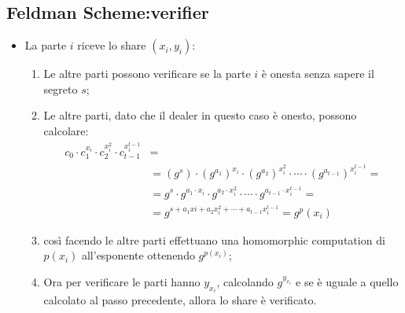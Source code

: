 \documentclass{book}
\begin{document}
\subsection{Feldman Scheme:verifier}
\begin{itemize}
	\item La parte \(i\) riceve lo share \((x_{i},y_{i})\):\begin{enumerate}
		      \item Le altre parti possono verificare se la parte \(i\) è onesta senza sapere il segreto \(s\);
		      \item Le altre parti, dato che il dealer in questo caso è onesto, possono calcolare:\begin{align*}
			            c_{0}\cdot c_{1}^{x_i}\cdot c_{2}^{x_{i}^{2}}\cdot c_{t-1}^{x_{i}^{t-1}} & =                                                                                                           \\                                                       & =(g^{s})\cdot {(g^{a_{1}})}^{x_{i}}\cdot {(g^{a_{2}})}^{x_{i}^2}\cdot\cdots\cdot {(g^{a_{t-1}})}^{x_{i}^{t-1}}= \\
			                                                                                     & = g^{s}\cdot g^{a_{1}\cdot x_{i}}\cdot g^{a_{2}\cdot x_{i}^2}\cdot\cdots\cdot g^{a_{t-1}\cdot x_{i}^{t-1}}= \\
			                                                                                     & = g^{s+a_{1}x{i}+a_{2}x_{i}^2+\cdots +a_{t-1}x_{i}^{t-1}}=g^p(x_{i})
		            \end{align*}
		      \item così facendo le altre parti effettuano una homomorphic computation di \(p(x_{i})\) all'esponente ottenendo \(g^{p(x_{i})}\);
		      \item Ora per verificare le parti hanno \(y_{x_{i}}\), calcolando \(g^{y_{x_{i}}}\) e se è uguale a quello calcolato al passo precedente, allora lo share è verificato\@.
	      \end{enumerate}
\end{itemize}
\end{document}

